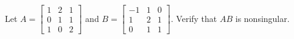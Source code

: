 Let 
$A = 
\begin{bmatrix} 
1 & 2 & 1 \\ 
0 & 1 & 1\\ 
1 & 0 & 2 
\end{bmatrix}$ 
and 
$B = 
\begin{bmatrix}
-1 & 1 & 0\\
1 & 2 & 1\\
0 & 1 & 1 
\end{bmatrix}$.
Verify that $AB$ is nonsingular.